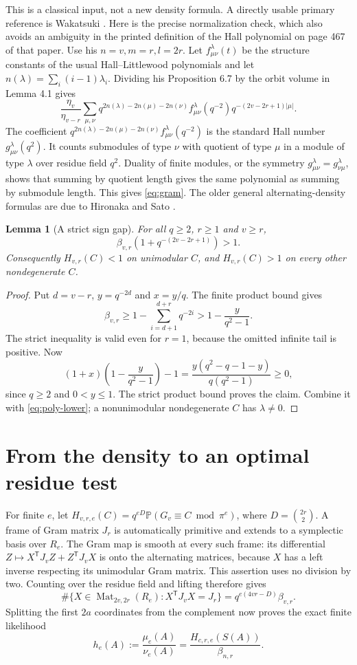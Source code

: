 \documentclass[11pt]{article}
\newtheorem{lemma}[theorem]{Lemma}
\newcommand{\Pp}{\mathbb P}
\newcommand{\Mat}{\operatorname{Mat}}
\begin{document}
This is a classical input, not a new density formula. A directly usable primary reference is Wakatsuki \cite[Theorem 4.3 and Proposition 4.4]{wakatsuki}. Here is the precise normalization check, which also avoids an ambiguity in the printed definition of the Hall polynomial on page 467 of that paper. Use his $n=v,m=r,l=2r$. Let $f^\lambda_{\mu\nu}(t)$ be the structure constants of the usual Hall--Littlewood polynomials and let $n(\lambda)=\sum_i(i-1)\lambda_i$. Dividing his Proposition 6.7 by the orbit volume in Lemma 4.1 gives
\[
 \frac{\eta_v}{\eta_{v-r}}
 \sum_{\mu,\nu}
 q^{2n(\lambda)-2n(\mu)-2n(\nu)}
 f^\lambda_{\mu\nu}(q^{-2})
 q^{-(2v-2r+1)|\mu|}.
\]
The coefficient
$q^{2n(\lambda)-2n(\mu)-2n(\nu)}f^\lambda_{\mu\nu}(q^{-2})$
is the standard Hall number $g^\lambda_{\mu\nu}(q^2)$. It counts submodules of type $\nu$ with quotient of type $\mu$ in a module of type $\lambda$ over residue field $q^2$. Duality of finite modules, or the symmetry $g^\lambda_{\mu\nu}=g^\lambda_{\nu\mu}$, shows that summing by quotient length gives the same polynomial as summing by submodule length. This gives \eqref{eq:gram}. The older general alternating-density formulas are due to Hironaka and Sato \cite{hironaka-sato}.

\begin{lemma}[A strict sign gap]\label{lem:gap}
For all $q\ge2$, $r\ge1$ and $v\ge r$,
\[
 \beta_{v,r}\left(1+q^{-(2v-2r+1)}\right)>1.
\]
Consequently $H_{v,r}(C)<1$ on unimodular $C$, and $H_{v,r}(C)>1$ on every other nondegenerate $C$.
\end{lemma}
\begin{proof}
Put $d=v-r$, $y=q^{-2d}$ and $x=y/q$. The finite product bound gives
\[
 \beta_{v,r}\ge1-\sum_{i=d+1}^{d+r}q^{-2i}
 >1-\frac{y}{q^2-1}.
\]
The strict inequality is valid even for $r=1$, because the omitted infinite tail is positive. Now
\[
 (1+x)\left(1-\frac{y}{q^2-1}\right)-1
 =\frac{y(q^2-q-1-y)}{q(q^2-1)}\ge0,
\]
since $q\ge2$ and $0<y\le1$. The strict product bound proves the claim. Combine it with \eqref{eq:poly-lower}; a nonunimodular nondegenerate $C$ has $\lambda\ne0$.
\end{proof}

\section{From the density to an optimal residue test}
For finite $e$, let $H_{v,r,e}(C)=q^{eD}\Pp(G_v\equiv C\bmod\pi^e)$, where $D=\binom{2r}{2}$. A frame of Gram matrix $J_r$ is automatically primitive and extends to a symplectic basis over $R_e$. The Gram map is smooth at every such frame: its differential
$Z\mapsto X^{\mathsf T}J_vZ+Z^{\mathsf T}J_vX$ is onto the alternating matrices, because $X$ has a left inverse respecting its unimodular Gram matrix. This assertion uses no division by two. Counting over the residue field and lifting therefore gives
\[
 \#\{X\in\Mat_{2v,2r}(R_e):X^{\mathsf T}J_vX=J_r\}
 =q^{e(4vr-D)}\beta_{v,r}.
\]
Splitting the first $2a$ coordinates from the complement now proves the exact finite likelihood
\begin{equation}\label{eq:finite-likelihood}
 h_e(A):=\frac{\mu_e(A)}{\nu_e(A)}
 =\frac{H_{c,r,e}(S(A))}{\beta_{n,r}}.
\end{equation}
\end{document}
